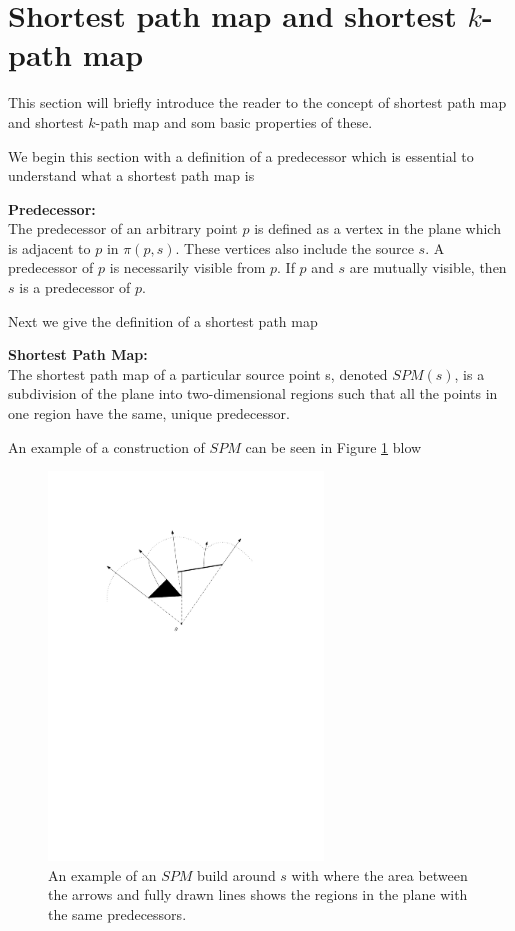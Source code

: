 \section{Shortest path map and shortest $k$-path map}

This section will briefly introduce the reader to the concept of shortest path map
and shortest $k$-path map and som basic properties of these.

We begin this section with a definition of a predecessor which is essential to understand
what a shortest path map is

\begin{mydef}
	\textbf{Predecessor:} \\ 
	The predecessor of an arbitrary point $p$ is defined as a vertex in the plane which is 
	adjacent to $p$ in $\pi(p,s)$. These vertices also include the source $s$. A predecessor of
	$p$ is necessarily visible from $p$. If $p$ and $s$ are mutually visible,
	then $s$ is a predecessor of $p$. \cite{HershbergerS99} 
\end{mydef}

Next we give the definition of a shortest path map

\begin{mydef}
	\textbf{Shortest Path Map:} \\ 
	The shortest path map  of a
	particular source point s, denoted $SPM(s)$, is a subdivision of the plane
	into two-dimensional regions such that all the points in one region have the
	same, unique predecessor\cite{HershbergerS99}. 
\end{mydef}

An example of a construction of $SPM$ can be seen in Figure \ref{fig:exampleofspms} blow

\begin{figure}[H] 
	\centering
	\includegraphics[width=0.65\textwidth]{figures/exampleofspms.pdf}
	\caption{An example of an $SPM$ build around $s$ with where the area between
	         the arrows and fully drawn lines shows the regions in the plane with
	         the same predecessors\cite{HershbergerS99}.}
	\label{fig:exampleofspms} 
\end{figure}

